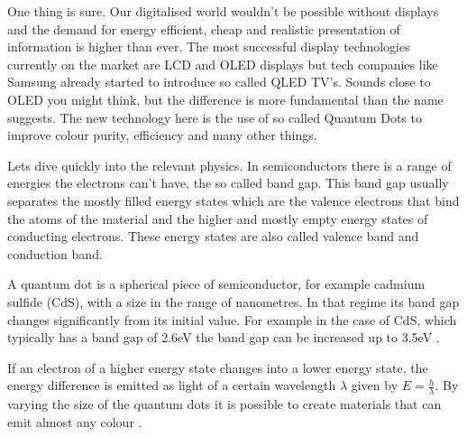\documentclass[11pt,a4paper]{article} %
\begin{document}
\begin{multicols}{2} %

    One thing is sure. Our digitalised world wouldn’t be possible without
    displays and the demand for energy efficient, cheap and realistic
    presentation
    of information is higher than ever. The most successful display
    technologies
    currently on the market are LCD and OLED displays but tech companies like
    Samsung already started to introduce so called QLED TV’s. Sounds close to
    OLED
    you might think, but the difference is more fundamental than the name
    suggests.
    The new technology here is the use of so called Quantum Dots to improve
    colour
    purity, efficiency and many other things.

    Lets dive quickly into the relevant physics.
    In semiconductors there is a range of energies the electrons can’t have,
    the so called band gap. This band gap usually separates the mostly filled
    energy states which are the valence electrons that bind the atoms of the
    material and the higher and mostly empty energy states of conducting
    electrons.
    These energy states are also called valence band and conduction band. 
    
    A  quantum dot is a spherical piece of semiconductor, for example cadmium
    sulfide (CdS), with a size in the range of nanometres. In that regime its 
    band gap changes significantly from its initial value. For example in the case of
    CdS, which typically has a band gap of 2.6eV the band gap can be increased up to
    3.5eV \cite{Brus1998}.

    If an electron of a higher energy state changes into a lower energy state,
    the energy difference is emitted as light of a certain wavelength $\lambda$
    given by $E=\frac{h}{\lambda}$. By varying the size of the quantum dots it
    is possible to create	materials that can emit almost any colour \cite{Brus1998}.


\end{multicols}
\end{document}
